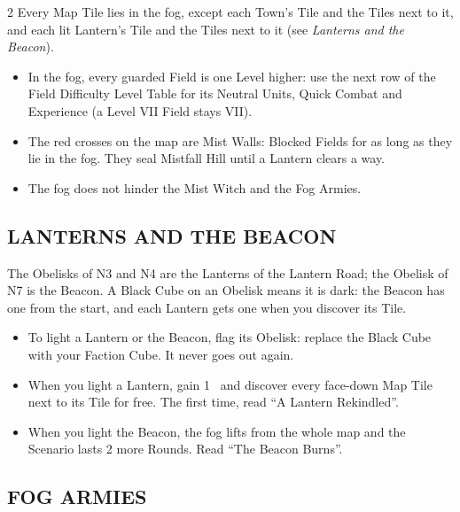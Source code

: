 \begin{multicols*}{2}
Every Map Tile lies in the fog, except each Town's Tile and the Tiles next to it, and each lit Lantern's Tile and the Tiles next to it (see \textit{Lanterns and the Beacon}).
\begin{itemize}
  \item In the fog, every guarded Field is one Level higher: use the next row of the Field Difficulty Level Table for its Neutral Units, Quick Combat and Experience (a Level VII Field stays VII).
  \item The red crosses on the map are Mist Walls: Blocked Fields for as long as they lie in the fog. They seal Mistfall Hill until a Lantern clears a way.
  \item The fog does not hinder the Mist Witch and the Fog Armies.
\end{itemize}

\subsection*{\MakeUppercase{Lanterns and the Beacon}}

The Obelisks of N3 and N4 are the Lanterns of the Lantern Road; the Obelisk of N7 is the Beacon. A Black Cube on an Obelisk means it is dark: the Beacon has one from the start, and each Lantern gets one when you discover its Tile.
\begin{itemize}
  \item To light a Lantern or the Beacon, flag its Obelisk: replace the Black Cube with your Faction Cube. It never goes out again.
  \item When you light a Lantern, gain 1~ and discover every face-down Map Tile next to its Tile for free. The first time, read ``A Lantern Rekindled''.
  \item When you light the Beacon, the fog lifts from the whole map and the Scenario lasts 2 more Rounds. Read ``The Beacon Burns''.
\end{itemize}

\subsection*{\MakeUppercase{Fog Armies}}


\end{multicols*}
